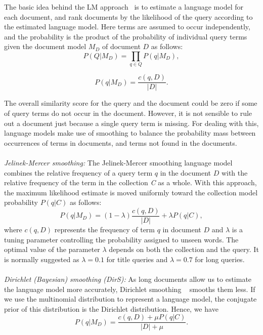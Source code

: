 The basic idea behind the LM approach~\citep{zhai2004study} is to estimate a language model for each document, and rank documents by the likelihood of the query according to the estimated language model. Here terms are assumed to occur independently, and the probability is the product of the probability of individual query terms given the document model $ M_{D} $ of document $ D $ as follows:
\begin{equation}
\label{eq:multinomial}
 P(Q|M_{D}) = \prod\limits_{q\in Q} P(q|M_{D}), 
\end{equation}

\begin{equation}
\label{eq:multinomial}
 P(q|M_{D}) = \frac{c(q,D)}{|D|}.
\end{equation}

The overall similarity score for the query and the document could be zero if some of query terms do not occur in the document. However, it is not sensible to rule out a document just because a single query term is missing. For dealing with this, language models make use of smoothing to balance the probability mass between occurrences of terms in documents, and terms not found in the documents.
\\\\
\textit{Jelinek-Mercer smoothing:} The Jelinek-Mercer smoothing language model~\citep{zhai2004study} combines the relative frequency of a query term $q$ in the document $ D $ with the relative frequency of the term in the collection \textit{C} as a whole. With this approach, the maximum likelihood estimate is moved uniformly toward the collection model probability $ P(q|C) $ as follows:
\begin{equation}
P(q|M_{D}) = (1-\lambda)\frac{c(q,D)}{|D|}+\lambda P(q|C), 
\label{eq:jmsmoothing}
\end{equation} 
where $ c(q,D) $ represents the frequency of term $ q $ in document $ D $ and $ \lambda $ is a tuning parameter controlling the probability assigned to unseen words. The optimal value of the parameter $ \lambda $ depends on both the collection and the query. It is normally suggested as $ \lambda = 0.1$ for title queries and $ \lambda = 0.7$ for long queries.
\\\\
\textit{Dirichlet (Bayesian) smoothing (DirS):} As long documents allow us to estimate the language model more accurately, Dirichlet smoothing ~\citep{zhai2004study} smooths them less. If we use the multinomial distribution to represent a language model, the conjugate prior of this distribution is the Dirichlet distribution. Hence, we have
\begin{equation}
\label{eq:bayessmoothing}
 P(q|M_{D}) = \frac{c(q,D) + \mu P(q|C)}{|D| + \mu}.
\end{equation} 


